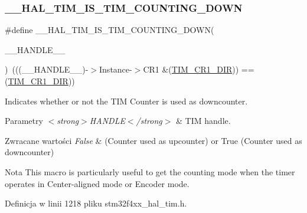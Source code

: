 \subsubsection{\texorpdfstring{\+\_\+\+\_\+\+H\+A\+L\+\_\+\+T\+I\+M\+\_\+\+I\+S\+\_\+\+T\+I\+M\+\_\+\+C\+O\+U\+N\+T\+I\+N\+G\+\_\+\+D\+O\+WN}{\_\_HAL\_TIM\_IS\_TIM\_COUNTING\_DOWN}}
{\footnotesize\ttfamily \#define \+\_\+\+\_\+\+H\+A\+L\+\_\+\+T\+I\+M\+\_\+\+I\+S\+\_\+\+T\+I\+M\+\_\+\+C\+O\+U\+N\+T\+I\+N\+G\+\_\+\+D\+O\+WN(\begin{DoxyParamCaption}\item[{}]{\+\_\+\+\_\+\+H\+A\+N\+D\+L\+E\+\_\+\+\_\+ }\end{DoxyParamCaption})~(((\+\_\+\+\_\+\+H\+A\+N\+D\+L\+E\+\_\+\+\_\+)-\/$>$Instance-\/$>$C\+R1 \&(\hyperlink{group___peripheral___registers___bits___definition_gacea10770904af189f3aaeb97b45722aa}{T\+I\+M\+\_\+\+C\+R1\+\_\+\+D\+IR})) == (\hyperlink{group___peripheral___registers___bits___definition_gacea10770904af189f3aaeb97b45722aa}{T\+I\+M\+\_\+\+C\+R1\+\_\+\+D\+IR}))}



Indicates whether or not the T\+IM Counter is used as downcounter. 


\begin{DoxyParams}{Parametry}
{\em $<$strong$>$\+H\+A\+N\+D\+L\+E$<$/strong$>$} & T\+IM handle. \\
\hline
\end{DoxyParams}

\begin{DoxyRetVals}{Zwracane wartości}
{\em False} & (Counter used as upcounter) or True (Counter used as downcounter) \\
\hline
\end{DoxyRetVals}
\begin{DoxyNote}{Nota}
This macro is particularly useful to get the counting mode when the timer operates in Center-\/aligned mode or Encoder mode. 
\end{DoxyNote}


Definicja w linii 1218 pliku stm32f4xx\+\_\+hal\+\_\+tim.\+h.

\mbox{\label{group___t_i_m___exported___macros_ga69d63e147faeca8909e9679f684c0325}} 
